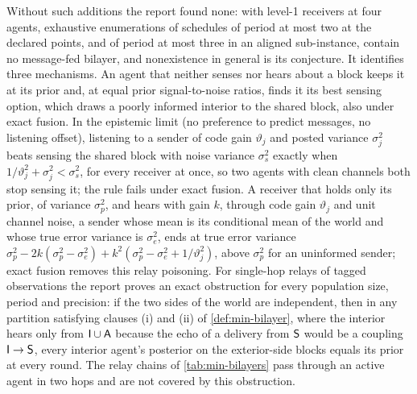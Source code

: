 Without such additions the report found none: with level-1 receivers at four agents, exhaustive enumerations of schedules of period at most two at the declared points, and of period at most three in an aligned sub-instance, contain no message-fed bilayer, and nonexistence in general is its conjecture. It identifies three mechanisms. An agent that neither senses nor hears about a block keeps it at its prior and, at equal prior signal-to-noise ratios, finds it its best sensing option, which draws a poorly informed interior to the shared block, also under exact fusion. In the epistemic limit (no preference to predict messages, no listening offset), listening to a sender of code gain $\vartheta_j$ and posted variance $\sigma_j^2$ beats sensing the shared block with noise variance $\sigma_s^2$ exactly when $1/\vartheta_j^2+\sigma_j^2<\sigma_s^2$, for every receiver at once, so two agents with clean channels both stop sensing it; the rule fails under exact fusion. A receiver that holds only its prior, of variance $\sigma_p^2$, and hears with gain $k$, through code gain $\vartheta_j$ and unit channel noise, a sender whose mean is its conditional mean of the world and whose true error variance is $\sigma_e^2$, ends at true error variance $\sigma_p^2-2k(\sigma_p^2-\sigma_e^2)+k^2(\sigma_p^2-\sigma_e^2+1/\vartheta_j^2)$, above $\sigma_p^2$ for an uninformed sender; exact fusion removes this relay poisoning. For single-hop relays of tagged observations the report proves an exact obstruction for every population size, period and precision: if the two sides of the world are independent, then in any partition satisfying clauses (i) and (ii) of \cref{def:min-bilayer}, where the interior hears only from $\mathsf{I}\cup\mathsf{A}$ because the echo of a delivery from $\mathsf{S}$ would be a coupling $\mathsf{I}\to\mathsf{S}$, every interior agent's posterior on the exterior-side blocks equals its prior at every round. The relay chains of \cref{tab:min-bilayers} pass through an active agent in two hops and are not covered by this obstruction.

